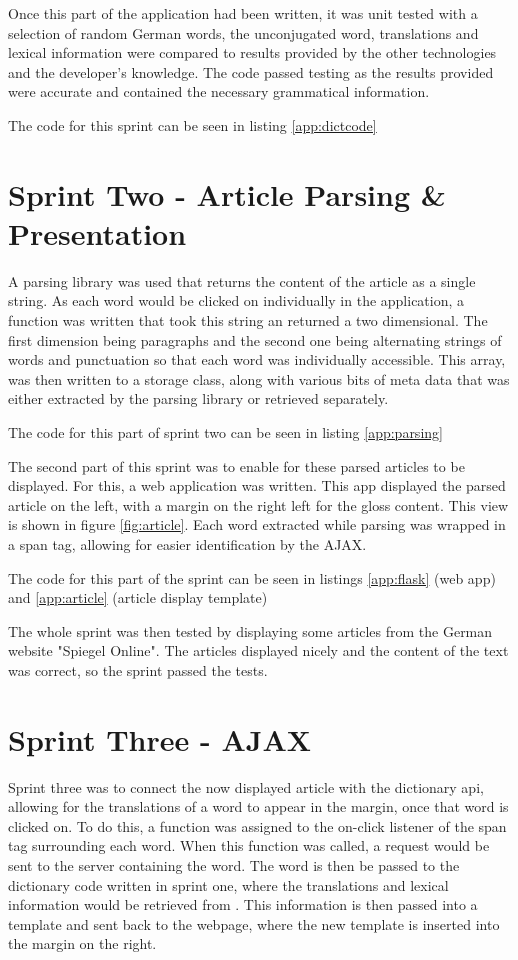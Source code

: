 Once this part of the application had been written, it was unit tested with a selection of random German words, the unconjugated word, translations and lexical information were compared to results provided by the other technologies and the developer's knowledge. The code passed testing as the results provided were accurate and contained the necessary grammatical information. 

The code for this sprint can be seen in listing \ref{app:dictcode}

\section{Sprint Two - Article Parsing \& Presentation}

A parsing library was used that returns the content of the article as a single string.  As each word would be clicked on individually in the application, a function was written that took this string an returned a two dimensional. The first dimension being paragraphs and the second one being alternating strings of words and punctuation so that each word was individually accessible. This array, was then written to a storage class, along with various bits of meta data that was either extracted by the parsing library or retrieved separately.  

The code for this part of sprint two can be seen in listing \ref{app:parsing}

The second part of this sprint was to enable for these parsed articles to be displayed. For this, a web application was written. This app displayed the parsed article on the left, with a margin on the right left for the gloss content. This view is shown in figure \ref{fig:article}. Each word extracted while parsing was wrapped in a span tag, allowing for easier identification by the AJAX.

The code for this part of the sprint can be seen in listings \ref{app:flask} (web  app) and \ref{app:article} (article display template)

The whole sprint was then tested by displaying some articles from the German website "Spiegel Online". The articles displayed nicely and the content of the text was correct, so the sprint passed the tests.

\section{Sprint Three - AJAX}

Sprint three was to connect the now displayed article with the dictionary api, allowing for the translations of a word to appear in the margin, once that word is clicked on. To do this, a function was assigned to the on-click listener of the span tag surrounding each word. When this function was called, a request would be sent to the server containing the word. The word is then be passed to the dictionary code written in sprint one, where the translations and lexical information would be retrieved from \textcite{oxford}. This information is then passed into a template and sent back to the webpage, where the new template is inserted into the margin on the right. 

